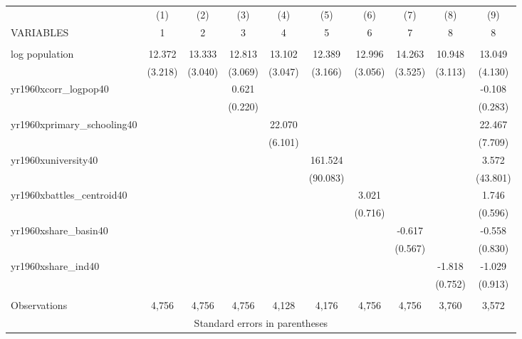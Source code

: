 \documentclass[]{article}
\begin{document}
\begin{tabular}{lccccccccc} \hline
 & (1) & (2) & (3) & (4) & (5) & (6) & (7) & (8) & (9) \\
VARIABLES & 1 & 2 & 3 & 4 & 5 & 6 & 7 & 8 & 8 \\ \hline
 &  &  &  &  &  &  &  &  &  \\
log population & 12.372 & 13.333 & 12.813 & 13.102 & 12.389 & 12.996 & 14.263 & 10.948 & 13.049 \\
 & (3.218) & (3.040) & (3.069) & (3.047) & (3.166) & (3.056) & (3.525) & (3.113) & (4.130) \\
yr1960xcorr\_logpop40 &  &  & 0.621 &  &  &  &  &  & -0.108 \\
 &  &  & (0.220) &  &  &  &  &  & (0.283) \\
yr1960xprimary\_schooling40 &  &  &  & 22.070 &  &  &  &  & 22.467 \\
 &  &  &  & (6.101) &  &  &  &  & (7.709) \\
yr1960xuniversity40 &  &  &  &  & 161.524 &  &  &  & 3.572 \\
 &  &  &  &  & (90.083) &  &  &  & (43.801) \\
yr1960xbattles\_centroid40 &  &  &  &  &  & 3.021 &  &  & 1.746 \\
 &  &  &  &  &  & (0.716) &  &  & (0.596) \\
yr1960xshare\_basin40 &  &  &  &  &  &  & -0.617 &  & -0.558 \\
 &  &  &  &  &  &  & (0.567) &  & (0.830) \\
yr1960xshare\_ind40 &  &  &  &  &  &  &  & -1.818 & -1.029 \\
 &  &  &  &  &  &  &  & (0.752) & (0.913) \\
 &  &  &  &  &  &  &  &  &  \\
 Observations & 4,756 & 4,756 & 4,756 & 4,128 & 4,176 & 4,756 & 4,756 & 3,760 & 3,572 \\ \hline
\multicolumn{10}{c}{ Standard errors in parentheses} \\
\end{tabular}
\end{document}
